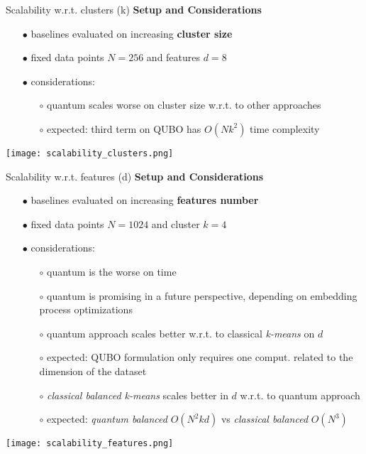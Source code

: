		\begin{frame}[allowframebreaks]{Scalability w.r.t. clusters (k)}
			\textbf{Setup and Considerations}
			\begin{itemize}
				\item[$\bullet$] baselines evaluated on increasing \textbf{cluster size}
				\item[$\bullet$] fixed data points $N=256$ and features $d=8$
				\item[$\bullet$] considerations:
				\begin{itemize}
					\item[$\circ$] quantum scales worse on cluster size w.r.t. to other approaches
					\item[$\circ$] expected: third term on QUBO has $O(Nk^2)$ time complexity
				\end{itemize} 
			\end{itemize}
			\begin{center}
				\texttt{[image: scalability\_clusters.png]}
			\end{center}
		\end{frame}

		\begin{frame}[allowframebreaks]{Scalability w.r.t. features (d)}
			\textbf{Setup and Considerations}
			\begin{itemize}
				\item[$\bullet$] baselines evaluated on increasing \textbf{features number}
				\item[$\bullet$] fixed data points $N=1024$ and cluster $k=4$ 
				\item[$\bullet$] considerations:
				\begin{itemize}
					\item[$\circ$] quantum is the worse on time 
					\item[$\circ$] quantum is promising in a future perspective, depending on embedding process optimizations
					\item[$\circ$] quantum approach scales better w.r.t. to classical \textit{k-means} on $d$  
					\item[$\circ$] expected: QUBO formulation only requires one comput. related to the dimension of the dataset %
					\item[$\circ$] \textit{classical balanced k-means} scales better in $d$ w.r.t. to quantum approach 
					\item[$\circ$] expected: \textit{quantum balanced} $O(N^2kd)$ vs \textit{classical balanced} $O(N^3)$  
				\end{itemize} 
			\end{itemize}
			\begin{center}
				\texttt{[image: scalability\_features.png]}
			\end{center}
		\end{frame}
	

